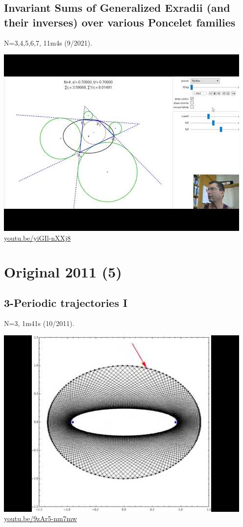 \documentclass[12pt]{amsart}
\begin{document}
\subsection{Invariant Sums of Generalized Exradii (and their inverses) over various Poncelet families}
\label{vid:yiGIl-nXXj8}
\noindent N=3,4,5,6,7, 11m4s (9/2021). 
\begin{center}\includegraphics[width=.5\textwidth]{pics/yiGIl-nXXj8.jpg} \\ 
\href{https://youtu.be/yiGIl-nXXj8}{\url{youtu.be/yiGIl-nXXj8}}\end{center}
% 

\section{Original 2011 (5)}

\subsection{3-Periodic trajectories I}
\label{vid:9zAr5-nm7mw}
\noindent N=3, 1m41s (10/2011). 
\begin{center}\includegraphics[width=.5\textwidth]{pics/9zAr5-nm7mw.jpg} \\ 
\href{https://youtu.be/9zAr5-nm7mw}{\url{youtu.be/9zAr5-nm7mw}}\end{center}
% 
\end{document}
